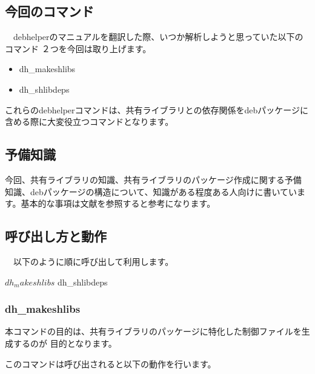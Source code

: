 \documentclass[mingoth,a4paper]{jsarticle}
\begin{document}
\clearpage


\subsection{今回のコマンド}

　debhelperのマニュアルを翻訳した際、いつか解析しようと思っていた以下のコマンド
２つを今回は取り上げます。

\begin{itemize}
\item dh\_makeshlibs
\item dh\_shlibdeps
\end{itemize}

 これらのdebhelperコマンドは、共有ライブラリとの依存関係をdebパッケージに
含める際に大変役立つコマンドとなります。

\subsection{予備知識}

 今回、共有ライブラリの知識、共有ライブラリのパッケージ作成に関する予備
知識、debパッケージの構造について、知識がある程度ある人向けに書いていま
す。基本的な事項は文献\cite{levine,sakai,satorutakabayashi,junichiuekawalibrary,man5deb}を参照すると参考になります。

\subsection{呼び出し方と動作}

　以下のように順に呼び出して利用します。

\begin{commandline}
$ dh_makeshlibs 
$ dh_shlibdeps
\end{commandline}

\subsubsection{dh\_makeshlibs}

 本コマンドの目的は、共有ライブラリのパッケージに特化した制御ファイルを生成するのが
目的となります。

このコマンドは呼び出されると以下の動作を行います。
\end{document}
